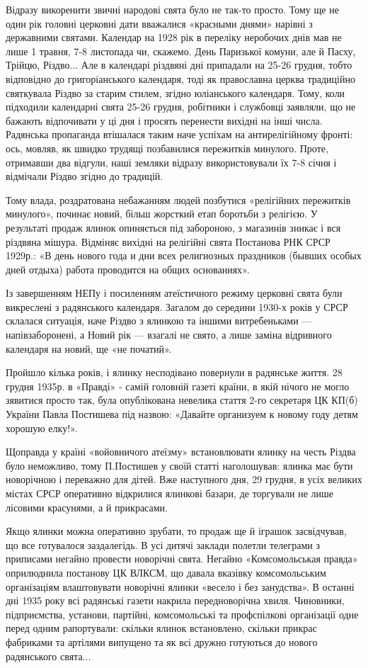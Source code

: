 Відразу викоренити звичні народові свята було не так-то просто. Тому ще не один
рік головні церковні дати вважалися «красными днями» нарівні з державними
святами. Календар на 1928 рік в переліку неробочих днів мав не лише 1 травня,
7-8 листопада чи, скажемо. День Паризької комуни, але й Пасху, Трійцю, Різдво...
Але в календарі різдвяні дні припадали на 25-26 грудня, тобто відповідно до
григоріанського календаря, тоді як православна церква традиційно святкувала
Різдво за старим стилем, згідно юліанського календаря. Тому, коли підходили
календарні свята 25-26 грудня, робітники і службовці заявляли, що не бажають
відпочивати у ці дня і просять перенести вихідні на інші числа. Радянська
пропаганда втішалася таким наче успіхам на антирелігійному фронті: ось, мовляв,
як швидко трудящі позбавилися пережитків минулого. Проте, отримавши два
відгули, наші земляки відразу використовували їх 7-8 січня і відмічали Різдво
згідно до традицій. 

Тому влада, роздратована небажанням людей позбутися «релігійних пережитків
минулого», починає новий, більш жорсткий етап боротьби з релігією. У результаті
продаж ялинок опиняється під забороною, з магазинів зникає і вся різдвяна
мішура. Відміняє вихідні на релігійні свята Постанова РНК СРСР 1929р.: «В день
нового года и дни всех религиозных праздников (бывших особых дней отдыха)
работа проводится на общих основаниях».

Із завершенням НЕПу і посиленням атеїстичного режиму церковні свята були
викреслені з радянського календаря. Загалом до середини 1930-х років у СРСР
склалася ситуація, наче Різдво з ялинкою та іншими витребеньками —
напівзаборонені, а Новий рік — взагалі не свято, а лише заміна відривного
календаря на новий, ще «не початий».

Пройшло кілька років, і ялинку несподівано повернули в радянське життя. 28
грудня 1935р. в «Правді» - самій головній газеті країни, в якій нічого не могло
зявитися просто так, була опублікована невелика стаття 2-го секретаря ЦК КП(б)
України Павла Постишева під назвою: «Давайте организуем к новому году детям
хорошую елку!».  

Щоправда у країні «войовничого атеїзму» встановлювати ялинку на честь Різдва
було неможливо, тому П.Постишев у своїй статті наголошував: ялинка має бути
новорічною і переважно для дітей. Вже наступного дня, 29 грудня, в усіх великих
містах СРСР оперативно відкрилися ялинкові базари, де торгували не лише
лісовими красунями, а й прикрасами.

Якщо ялинки можна оперативно зрубати, то продаж ще й іграшок засвідчував, що
все готувалося заздалегідь. В усі дитячі заклади полетли телеграми з приписами
негайно провести новорічні свята. Негайно «Комсомольськая правда»  оприлюднила
постанову ЦК ВЛКСМ, що давала вказівку комсомольським організаціям влаштовувати
новорічні ялинки «весело і без занудства». В останні дні 1935 року всі
радянські газети накрила передноворічна хвиля. Чиновники, підприємства,
установи, партійні, комсомольські та профспілкові організації одне перед одним
рапортували: скільки ялинок встановлено, скільки прикрас фабриками та артілями
випущено та як всі дружно готуються до нового радянського свята...

